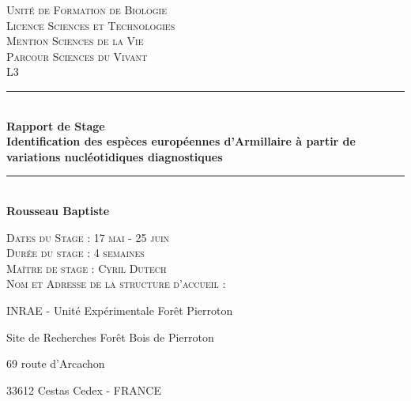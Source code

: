 
\begin{titlepage}

  \newcommand{\HRule}{\rule{\linewidth}{0.5mm}} %


\begin{figure}[ht!]

\end{figure}
\vspace{1.8 cm}

\begin{center}

  \textsc{\LARGE Unité de Formation de Biologie}\\[0.5cm]
  \textsc{\Large Licence Sciences et Technologies}\\[0.2cm]
  \textsc{\large Mention Sciences de la Vie}\\
  \textsc{\large Parcour Sciences du Vivant}\\
  \textsc{\large L3}\\

  \vspace{1 cm}
  \HRule \\[0.4cm]
  {\Huge \bfseries Rapport de Stage}\\[0.4cm]
  {\Huge \bfseries Identification des espèces européennes d'Armillaire à partir de variations nucléotidiques diagnostiques}\\
  \HRule \\[1cm]
 

\textbf{\LARGE Rousseau Baptiste}
\end{center}

\vspace{2.6cm}
\noindent\textsc{Dates du Stage : 17 mai - 25 juin}\\
\textsc{Durée du stage : 4 semaines}\\
\textsc{Maître de stage : Cyril Dutech}\\
\textsc{Nom et Adresse de la structure d’accueil :}
\setlength{\parindent}{5ex}
\par INRAE - Unité Expérimentale Forêt Pierroton
\par Site de Recherches Forêt Bois de Pierroton
\par 69 route d'Arcachon
\par 33612 Cestas Cedex - FRANCE


\end{titlepage}
